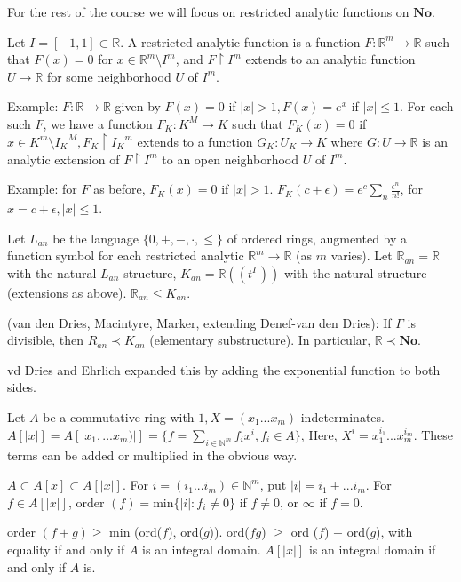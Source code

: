 For the rest of the course we will focus on restricted analytic functions on $\mathbf{No}$.

Let $I=[-1,1] \subset \mathbb{R}$. A restricted analytic function is a function $F: \mathbb{R}^m \rightarrow \mathbb{R}$ such that $F(x)=0$ for $x \in \mathbb{R}^{m} \setminus I^m$, and $F \restriction I^m$ extends to an analytic function $U \rightarrow \mathbb{R}$ for some neighborhood $U$ of $I^m$.

Example: $F: \mathbb{R} \rightarrow \mathbb{R}$ given by $F(x)=0$ if $|x|>1, F(x)=e^x$ if $|x| \leq 1$. For each such $F$, we have a function $F_K: K^M \rightarrow K$ such that $F_K(x)=0$ if $x \in K^m \setminus {I_K}^M, F_K \restriction {I_K}^m$ extends to a function $G_K: U_K \rightarrow K$ where $G: U \rightarrow \mathbb{R}$ is an analytic extension of $F \restriction I^m$ to an open neighborhood $U$ of $I^m$.

Example: for $F$ as before, $F_K(x)=0$ if $|x|>1$. $F_K(c+\epsilon)=e^{c}\sum_{n} \frac{\epsilon^n}{n!}$, for $x=c+\epsilon, |x| \leq 1$.

Let $L_{an}$ be the language $\{0,+, -, \cdot, \leq\}$ of ordered rings, augmented by a function symbol for each restricted analytic $\mathbb{R}^m \rightarrow \mathbb{R}$ (as $m$ varies). Let $\mathbb{R}_{an} = \mathbb{R}$ with the natural $L_{an}$ structure, $K_{an}=\mathbb{R}((t^{\Gamma}))$ with the natural structure (extensions as above). $\mathbb{R}_{an} \leq K_{an}$.

 (van den Dries, Macintyre, Marker, extending Denef-van den Dries): If $\Gamma$ is divisible, then $R_{an} \prec K_{an}$ (elementary substructure). In particular, $\mathbb{R} \prec \mathbf{No}$.

vd Dries and Ehrlich expanded this by adding the exponential function to both sides.

Let $A$ be a commutative ring with $1, X=(x_1...x_m)$ indeterminates. $A[|x|]=A[|x_1, ...x_m)|]=\{f=\sum_{i \in \mathbb{N}^m}f_i x^i, f_i \in A\}$,  Here, $X^i= x_{1}^{i_1}...x_{m}^{i_m}$. These terms can be added or multiplied in the obvious way.

$A \subset A[x] \subset A[|x|]$. For $i=(i_1...i_m ) \in \mathbb{N}^m$, put $|i|=i_1+...i_m$. For $f \in A[|x|]$, order $(f)=$min$\{|i|: f_i \neq 0\}$ if $f \neq 0$, or $\infty$ if $f=0$.

order $(f+g) \geq$ min (ord($f$), ord($g$)). ord($fg$) $\geq$ ord ($f$) $+$ ord($g$), with equality if and only if $A$ is an integral domain. $A[|x|]$ is an integral domain if and only if $A$ is.

